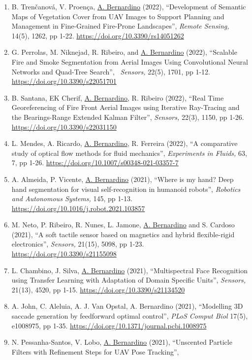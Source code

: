 \documentclass[
]{article}
\begin{document}
\begin{enumerate}
\item
  B. Trenčanová, V. Proença, \ul{A. Bernardino} (2022), ``Development of
  Semantic Maps of Vegetation Cover from UAV Images to Support Planning
  and Management in Fine-Grained Fire-Prone Landscapes'', \emph{Remote
  Sensing,} 14(5), 1262, pp 1-22.
  \url{https://doi.org/10.3390/rs14051262}
\item
  G. Perrolas, M. Niknejad, R. Ribeiro, and \ul{A. Bernardino} (2022),
  ``Scalable Fire and Smoke Segmentation from Aerial Images Using
  Convolutional Neural Networks and Quad-Tree Search'',~ \emph{Sensors,}
  22(5), 1701, pp 1-12. \url{https://doi.org/10.3390/s22051701}
\item
  B. Santana, EK Cherif, \ul{A. Bernardino}, R. Ribeiro (2022), ``Real
  Time Georeferencing of Fire Front Aerial Images using Iterative
  Ray-Tracing and the Bearings-Range Extended Kalman Filter'',
  \emph{Sensors,} 22(3), 1150, pp 1-26.
  \url{https://doi.org/10.3390/s22031150}~
\item
  L. Mendes, A. Ricardo, \ul{A. Bernardino}, R. Ferreira (2022), ``A
  comparative study of optical flow methods for fluid mechanics'',
  \emph{Experiments in Fluids,} 63, 7, pp 1-26.
  \url{https://doi.org/10.1007/s00348-021-03357-7}~
\item
  A. Almeida, P. Vicente, \ul{A. Bernardino} (2021), ``Where is my hand?
  Deep hand segmentation for visual self-recognition in humanoid
  robots'', \emph{Robotics and Autonomous Systems,} 145, pp 1-13.
  \url{https://doi.org/10.1016/j.robot.2021.103857}~~
\item
  M. Neto, P. Ribeiro, R. Nunes, L. Jamone, \ul{A. Bernardino} and S.
  Cardoso (2021), ``A soft tactile sensor based on magnetics and hybrid
  flexible-rigid electronics'', \emph{Sensors,} 21(15), 5098, pp 1-23.
  \url{https://doi.org/10.3390/s21155098}~~
\item
  L. Chambino, J. Silva, \ul{A. Bernardino} (2021), ``Multispectral Face
  Recognition using Transfer Learning with Adaptation of Domain Specific
  Units'', \emph{Sensors,} 21(13), 4520, pp 1-15.
  \url{https://doi.org/10.3390/s21134520}~
\item
  A. John, C. Aleluia, A. J. Van Opstal, A. Bernardino (2021),
  ``Modelling 3D saccade generation by feedforward optimal control'',
  \emph{PLoS Comput Biol} 17(5), e1008975, pp 1-35.
  \url{https://doi.org/10.1371/journal.pcbi.1008975}~
\item
  N. Pessanha-Santos, V. Lobo, \ul{A. Bernardino} (2021), ``Unscented
  Particle Filters with Refinement Steps for UAV Pose Tracking'',

\end{enumerate}
\end{document}
